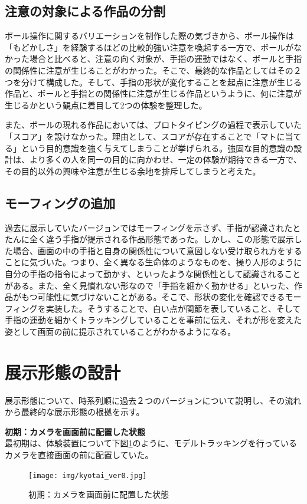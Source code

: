 \subsection{注意の対象による作品の分割}
ボール操作に関するバリエーションを制作した際の気づきから、ボール操作は「もどかしさ」を経験するほどの比較的強い注意を喚起する一方で、ボールがなかった場合と比べると、注意の向く対象が、手指の運動ではなく、ボールと手指の関係性に注意が生じることがわかった。そこで、最終的な作品としてはその２つを分けて構成した。そして、手指の形状が変化することを起点に注意が生じる作品と、ボールと手指との関係性に注意が生じる作品というように、何に注意が生じるかという観点に着目して2つの体験を整理した。

また、ボールの現れる作品においては、プロトタイピングの過程で表示していた「スコア」を設けなかった。理由として、スコアが存在することで「マトに当てる」という目的意識を強く与えてしまうことが挙げられる。強固な目的意識の設計は、より多くの人を同一の目的に向かわせ、一定の体験が期待できる一方で、その目的以外の興味や注意が生じる余地を排斥してしまうと考えた。

\subsection{モーフィングの追加}
過去に展示していたバージョンではモーフィングを示さず、手指が認識されたとたんに全く違う手指が提示される作品形態であった。しかし、この形態で展示した場合、画面の中の手指と自身の関係性について意図しない受け取られ方をすることに気づいた。つまり、全く異なる生命体のようなものを、操り人形のように自分の手指の指令によって動かす、といったような関係性として認識されることがある。また、全く見慣れない形なので「手指を細かく動かせる」といった、作品がもつ可能性に気づけないことがある。そこで、形状の変化を確認できるモーフィングを実装した。そうすることで、白い点が関節を表していること、そして手指の運動を細かくトラッキングしていることを事前に伝え、それが形を変えた姿として画面の前に提示されていることがわかるようになる。

\section{展示形態の設計}
展示形態について、時系列順に過去２つのバージョンについて説明し、その流れから最終的な展示形態の根拠を示す。

\textbf{初期：カメラを画面前に配置した状態}\\
最初期は、体験装置について下図\ref{fig:kyotai_ver0}のように、モデルトラッキングを行っているカメラを直接画面の前に配置していた。
\begin{figure}[H]
  \centering
  \texttt{[image: img/kyotai\_ver0.jpg]}
  \caption{初期：カメラを画面前に配置した状態}
  \label{fig:kyotai_ver0}
\end{figure}

